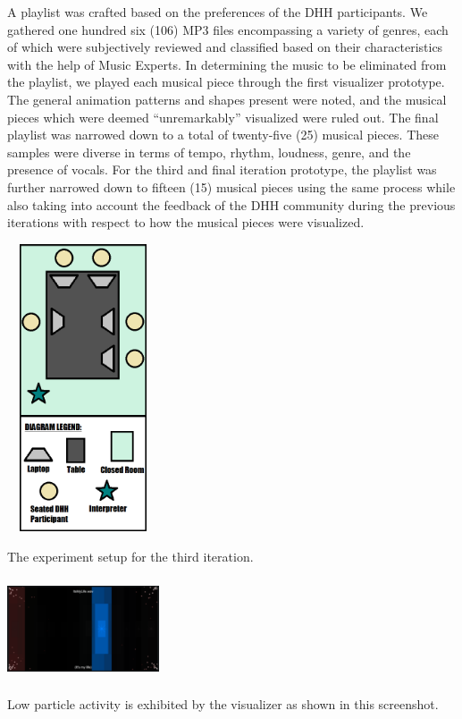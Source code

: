 \documentclass{sigchi-ext}
\begin{document}
A playlist was crafted based on the preferences of the DHH participants. We gathered one hundred six (106) MP3 files encompassing a variety of genres, each of which were subjectively reviewed and classified based on their characteristics with the help of Music Experts. In determining the music to be eliminated from the playlist, we played each musical piece through the first visualizer prototype. The general animation patterns and shapes present were noted, and the musical pieces which were deemed ``unremarkably'' visualized were ruled out. The final playlist was narrowed down to a total of twenty-five (25) musical pieces. These samples were diverse in terms of tempo, rhythm, loudness, genre, and the presence of vocals. For the third and final iteration prototype, the playlist was further narrowed down to fifteen (15) musical pieces using the same process while also taking into account the feedback of the DHH community during the previous iterations with respect to how the musical pieces were visualized.


\begin{marginfigure}[-20pc]
\begin{minipage}{\marginparwidth}
     \includegraphics[width=4.5cm,height=8.5cm]{figures/iter3SetupVector.png}
    \caption{The experiment setup for the third iteration.}
    \label{fig:iter3SetupVector}
    \end{minipage}
\end{marginfigure}

\begin{marginfigure}[1pc]
\begin{minipage}{\marginparwidth}
     \includegraphics[width=4.5cm,height=3cm]{figures/LowParticleActivity.png}
    \caption{Low particle activity is exhibited by the visualizer as shown in this screenshot.}
    \label{fig:lowparticle}
    \end{minipage}
\end{marginfigure}
\end{document}
